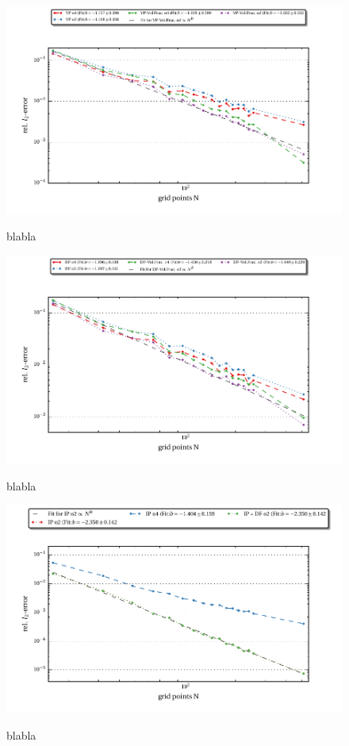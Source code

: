 \begin{figure}[!pt]
  \centering
  \includegraphics{gfx/immersed_boundary/hpflow/theo/vp.pdf}\label{fig:hpflow_vpgc_theo}
  \caption{blabla}
\end{figure}

\begin{figure}[!pb]
  \centering
  \includegraphics{gfx/immersed_boundary/hpflow/theo/df.pdf}\label{fig:hpflow_dfgc_theo}
  \caption{blabla}
\end{figure}


\begin{figure}[!pt]
  \centering
  \includegraphics{gfx/immersed_boundary/hpflow/theo/ip.pdf}\label{fig:hpflow_ipgc_theo}
  \caption{blabla}
\end{figure}

